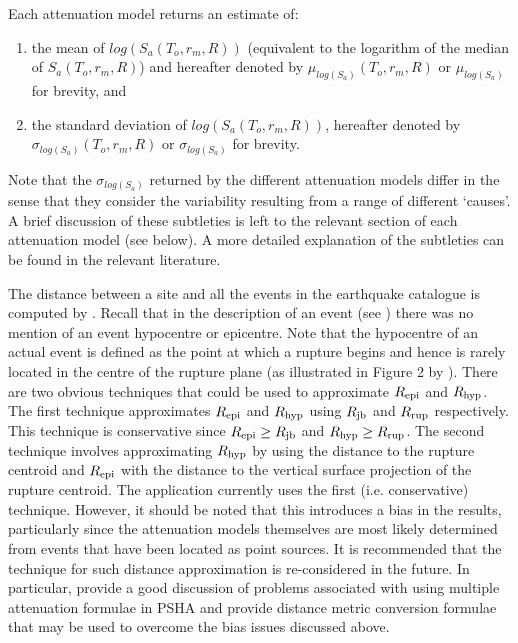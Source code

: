 Each attenuation model returns an estimate of:
\begin{enumerate}
\item the mean of $log(S_a(T_o,r_m,R))$ (equivalent to the
logarithm of the median of $S_a(T_o,r_m,R)$) and hereafter denoted
by $\mu_{log(S_a)}(T_o,r_m,R)$ or $\mu_{log(S_a)}$ for brevity,
and \item the standard deviation of $log(S_a(T_o,r_m,R))$,
hereafter denoted by \newline $\sigma_{log(S_a)}(T_o,r_m,R)$ or
$\sigma_{log(S_a)}$ for brevity.
\end{enumerate}
Note that the $\sigma_{log(S_a)}$ returned by the different
attenuation models differ in the sense that they consider the
variability resulting from a range of different `causes'. A brief
discussion of these subtleties is left to the relevant section of
each attenuation model (see below). A more detailed explanation of
the subtleties can be found in the relevant literature.

The distance between a site and all the events in the earthquake
catalogue is computed by . Recall that
in the description of an event (see )
there was no mention of an event hypocentre or epicentre. Note
that the hypocentre of an actual event is defined as the point at
which a rupture begins \citep{dr_Kramer96a} and hence is rarely
located in the centre of the rupture plane (as illustrated in
Figure 2 by \citet{dr_Sibson03a}). There are two obvious
techniques that could be used to approximate $\Repi$ and $\Rhyp$.
The first technique approximates $\Repi$ and $\Rhyp$ using $\Rjb$
and $\Rrup$ respectively. This technique is conservative since
\mbox{$\Repi \geq \Rjb$} and \mbox{$\Rhyp \geq \Rrup$}. The second
technique involves approximating $\Rhyp$ by using the distance to
the rupture centroid and $\Repi$ with the distance to the vertical
surface projection of the rupture centroid. The
 application currently uses the first (i.e.
conservative) technique. However, it should be noted that this
introduces a bias in the results, particularly since the
attenuation models themselves are most likely determined from
events that have been located as point sources. It is recommended
that the technique for such distance approximation is
re-considered in the future. In particular, \citet{dr_Bommer05a}
provide a good discussion of problems associated with using
multiple attenuation formulae in PSHA and \citet{dr_Scherbaum04a}
provide distance metric conversion formulae that may be used to
overcome the bias issues discussed above.


